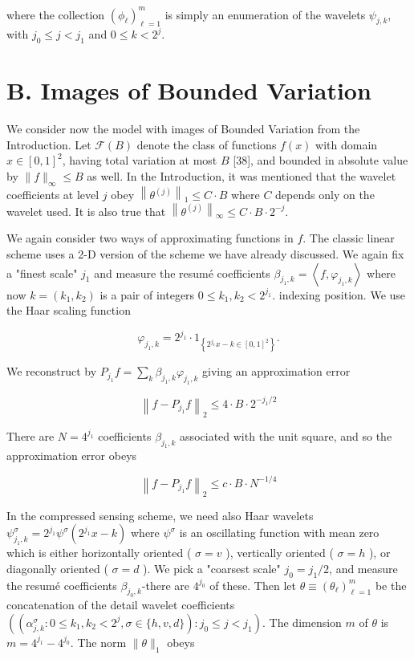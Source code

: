 \documentclass[10pt]{article}
\begin{document}
where the collection $\left(\phi_{\ell}\right)_{\ell=1}^{m}$ is simply an enumeration of the wavelets $\psi_{j, k}$, with $j_{0} \leq j<j_{1}$ and $0 \leq k<2^{j}$.

\section*{B. Images of Bounded Variation}
We consider now the model with images of Bounded Variation from the Introduction. Let $\mathcal{F}(B)$ denote the class of functions $f(x)$ with domain $x \in[0,1]^{2}$, having total variation at most $B$ [38], and bounded in absolute value by $\|f\|_{\infty} \leq B$ as well. In the Introduction, it was mentioned that the wavelet coefficients at level $j$ obey $\left\|\theta^{(j)}\right\|_{1} \leq C \cdot B$ where $C$ depends only on the wavelet used. It is also true that $\left\|\theta^{(j)}\right\|_{\infty} \leq C \cdot B \cdot 2^{-j}$.

We again consider two ways of approximating functions in $f$. The classic linear scheme uses a 2-D version of the scheme we have already discussed. We again fix a "finest scale" $j_{1}$ and measure the resumé coefficients $\beta_{j_{1}, k}=\left\langle f, \varphi_{j_{1}, k}\right\rangle$ where now $k=\left(k_{1}, k_{2}\right)$ is a pair of integers $0 \leq k_{1}, k_{2}<2^{j_{1}}$. indexing position. We use the Haar scaling function

$$
\varphi_{j_{1}, k}=2^{j_{1}} \cdot 1_{\left\{2^{j_{1}} x-k \in[0,1]^{2}\right\}} .
$$

We reconstruct by $P_{j_{1}} f=\sum_{k} \beta_{j_{1}, k} \varphi_{j_{1}, k}$ giving an approximation error

$$
\left\|f-P_{j_{1}} f\right\|_{2} \leq 4 \cdot B \cdot 2^{-j_{1} / 2}
$$

There are $N=4^{j_{1}}$ coefficients $\beta_{j_{1}, k}$ associated with the unit square, and so the approximation error obeys

$$
\left\|f-P_{j_{1}} f\right\|_{2} \leq c \cdot B \cdot N^{-1 / 4}
$$

In the compressed sensing scheme, we need also Haar wavelets $\psi_{j_{1}, k}^{\sigma}=2^{j_{1}} \psi^{\sigma}\left(2^{j_{1}} x-k\right)$ where $\psi^{\sigma}$ is an oscillating function with mean zero which is either horizontally oriented ( $\sigma=v$ ), vertically oriented ( $\sigma=h$ ), or diagonally oriented ( $\sigma=d$ ). We pick a "coarsest scale" $j_{0}=j_{1} / 2$, and measure the resumé coefficients $\beta_{j_{0}, k}$-there are $4^{j_{0}}$ of these. Then let $\theta \equiv\left(\theta_{\ell}\right)_{\ell=1}^{m}$ be the concatenation of the detail wavelet coefficients $\left(\left(\alpha_{j, k}^{\sigma}: 0 \leq k_{1}, k_{2}<2^{j}, \sigma \in\{h, v, d\}\right): j_{0} \leq j<j_{1}\right)$. The dimension $m$ of $\theta$ is $m=4^{j_{1}}-4^{j_{0}}$. The norm $\|\theta\|_{1}$ obeys
\end{document}
